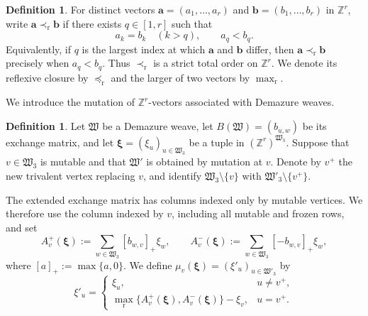 \documentclass[12pt, reqno]{amsart}
\theoremstyle{plain}
\theoremstyle{definition}
\newtheorem{definition}[theorem]{Definition}
\numberwithin{equation}{section}
\newcommand{\ZZ}{\mathbb{Z}}
\begin{document}
\begin{definition}\label{def:order-vector}
For
distinct vectors \(\mathbf a=(a_1,\ldots,a_r)\) and
\(\mathbf b=(b_1,\ldots,b_r)\) in \(\ZZ^r\), write
\(\mathbf a\prec_{\mathrm r}\mathbf b\) if there exists
\(q\in[1,r]\) such that
\begin{equation}\label{eq:right-lexicographic-order}
    a_k=b_k\quad(k>q),
    \qquad
    a_q<b_q.
\end{equation}
Equivalently, if \(q\) is the largest index at which \(\mathbf a\)
and \(\mathbf b\) differ, then
\(\mathbf a\prec_{\mathrm r}\mathbf b\) precisely when
\(a_q<b_q\). Thus \(\prec_{\mathrm r}\) is a strict total order on
\(\ZZ^r\). We denote its reflexive closure by
\(\preceq_{\mathrm r}\) and the larger of two vectors by
\(\max_{\mathrm r}\).
\end{definition}
We introduce the mutation of $\ZZ^r$-vectors associated with Demazure weaves.
\begin{definition}\label{def:mutlusztig}
    Let \(\mathfrak W\) be a Demazure weave, let
    \(B(\mathfrak W)=(b_{u,w})\) be its
    exchange matrix, and let
    \(\boldsymbol\xi=(\xi_u)_{u\in\mathfrak W_3}\) be a tuple in
    \((\ZZ^r)^{\mathfrak W_3}\). Suppose that \(v\in\mathfrak W_3\)
    is mutable and that \(\mathfrak W'\) is obtained by mutation at
    \(v\). Denote by \(v^+\) the new trivalent vertex replacing
    \(v\), and identify
    \(\mathfrak W_3\setminus\{v\}\) with
    \(\mathfrak W'_3\setminus\{v^+\}\).

    The extended exchange matrix has columns indexed only by mutable
    vertices. We therefore use the column indexed by \(v\), including
    all mutable and frozen rows, and set
    \begin{equation}\label{eq:two-vector-mutation-sums}
        A_v^+(\boldsymbol\xi)
        :=\sum_{w\in\mathfrak W_3}[b_{w,v}]_+\xi_w,
        \qquad
        A_v^-(\boldsymbol\xi)
        :=\sum_{w\in\mathfrak W_3}[-b_{w,v}]_+\xi_w,
    \end{equation}
    where \([a]_+:=\max\{a,0\}\). We define
    \(\mu_v(\boldsymbol\xi)
      =(\xi'_u)_{u\in\mathfrak W'_3}\) by
    \begin{equation}\label{eq:mutation-integer-vectors}
        \xi'_u=
        \begin{cases}
            \xi_u, & u\neq v^+,\\[1mm]
            \max_{\mathrm{r}}
            \bigl\{A_v^+(\boldsymbol\xi),
                   A_v^-(\boldsymbol\xi)\bigr\}-\xi_v,
                & u=v^+.
        \end{cases}
    \end{equation}
\end{definition}
\end{document}
